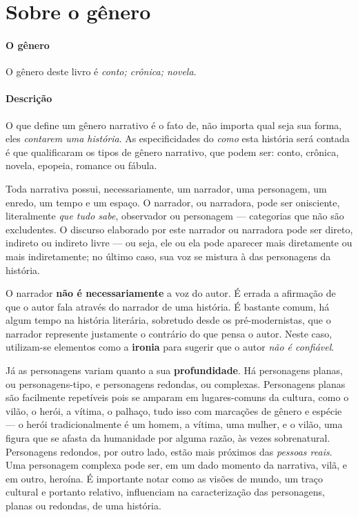 \documentclass[11pt]{extarticle}
\begin{document}
\section{Sobre o gênero}

\paragraph{O gênero} O gênero deste livro é \textit{conto; crônica; novela}. 


\paragraph{Descrição} O que define um gênero narrativo é o fato de, não importa
qual seja sua forma, eles \textit{contarem uma história}.
As especificidades do \textit{como} esta história será contada é que
qualificaram os tipos de gênero narrativo, que podem ser: conto, crônica, novela,
epopeia, romance ou fábula. 

Toda narrativa possui, necessariamente, um narrador, uma personagem, um enredo,
um tempo e um espaço. O narrador, ou narradora, pode ser onisciente, literalmente
\textit{que tudo sabe}, observador ou personagem --- categorias que não são excludentes.
O discurso elaborado por este narrador ou narradora pode ser direto, indireto ou indireto livre 
--- ou seja, ele ou ela pode aparecer mais diretamente ou mais indiretamente; no último caso,
sua voz se mistura à das personagens da história.

O narrador \textbf{não é necessariamente} a voz do autor. É errada a afirmação
de que o autor fala através do narrador de uma história. É bastante comum,
há algum tempo na história literária, sobretudo desde os pré-modernistas, que 
o narrador represente justamente o contrário do que pensa o autor. Neste caso, 
utilizam-se elementos como a \textbf{ironia} para sugerir que o autor \textit{não é confiável}.

Já as personagens variam quanto a sua \textbf{profundidade}. Há personagens planas, ou
personagens-tipo, e personagens redondas, ou complexas. Personagens planas
são facilmente repetíveis pois se amparam em lugares-comuns da cultura, como
o vilão, o herói, a vítima, o palhaço, tudo isso com marcações de gênero e espécie ---
o herói tradicionalmente é um homem, a vítima, uma mulher, e o vilão, uma figura que 
se afasta da humanidade por alguma razão, às vezes sobrenatural. 
Personagens redondos, por outro lado, estão mais próximos das \textit{pessoas reais}.
Uma personagem complexa pode ser, em um dado momento da narrativa, vilã, e em 
outro, heroína. É importante notar como as visões de mundo, um traço cultural e 
portanto relativo, influenciam na caracterização das personagens, planas 
ou redondas, de uma história.
\end{document}
